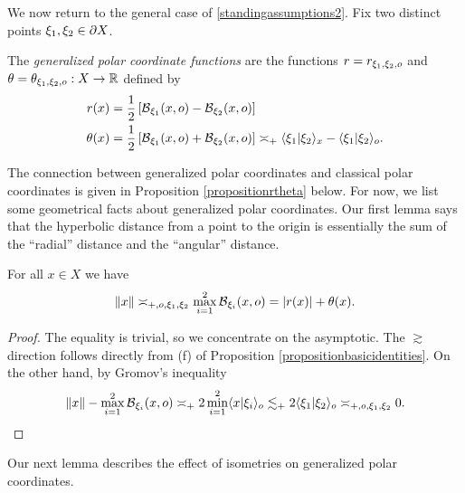 We now return to the general case of \6\ref{standingassumptions2}. Fix two distinct points $\xi_1,\xi_2\in\partial X$.
\begin{definition}
\label{definitionpolarcoordinates}
The \emph{generalized polar coordinate functions} are the functions $r = r_{\xi_1,\xi_2,o}$ and $\theta = \theta_{\xi_1,\xi_2,\zero}:X\to\R$ defined by
\begin{align*}
r(x) &= \frac12\left[\operatorname{\mathcal B}_{\xi_1}(x,o) - \operatorname{\mathcal B}_{\xi_2}(x,o)\right]\\
\theta(x) &= \frac12\left[\operatorname{\mathcal B}_{\xi_1}(x,o) + \operatorname{\mathcal B}_{\xi_2}(x,o)\right] \asymp_+ \langle \xi_1|\xi_2\rangle_x - \langle \xi_1|\xi_2\rangle_o.
\end{align*}
\end{definition}

The connection between generalized polar coordinates and classical polar coordinates is given in Proposition \ref{propositionrtheta} below. For now, we list some geometrical facts about generalized polar coordinates. Our first lemma says that the hyperbolic distance from a point to the origin is essentially the sum of the ``radial'' distance and the ``angular'' distance.

\begin{lemma}
\label{lemmafabs}
For all $x\in X$ we have
\[
\|x\| \asymp_{+,o,\xi_1,\xi_2} \max_{i = 1}^2\operatorname{\mathcal B}_{\xi_i}(x,o) = |r(x)| + \theta(x).
\]
\end{lemma}
\begin{proof}
The equality is trivial, so we concentrate on the asymptotic. The $\gtrsim$ direction follows directly from (f) of Proposition \ref{propositionbasicidentities}. On the other hand, by Gromov's inequality
\begin{align*}
\|x\| - \max_{i = 1}^2\operatorname{\mathcal B}_{\xi_i}(x,o)
\asymp_+ 2\min_{i = 1}^2 \langle x|\xi_i\rangle_o
\lesssim_+ 2\langle \xi_1|\xi_2\rangle_o \asymp_{+,o,\xi_1,\xi_2} 0.
\end{align*}
\end{proof}

Our next lemma describes the effect of isometries on generalized polar coordinates.

